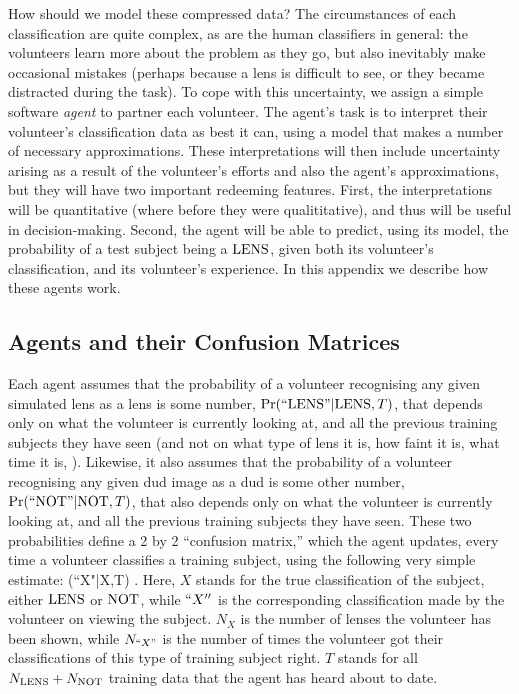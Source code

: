 \documentclass[useAMS,usenatbib,a4paper]{mn2e}
\begin{document}
How should we model these compressed data? The circumstances of each
classification are quite complex, as are the human classifiers in general: the
volunteers learn more about the problem as they go, but also inevitably make
occasional mistakes (perhaps because a lens is difficult to see, or they
became distracted during the task). To cope with this uncertainty, we assign a
simple software {\it agent} to partner each volunteer. The agent's task is to
interpret their volunteer's classification data as best it can, using a model
that makes a number of necessary approximations. These interpretations will
then include uncertainty arising as a result of the volunteer's efforts and
also the agent's approximations, but they will have two important redeeming
features. First, the interpretations will be quantitative (where before they
were qualititative),  and thus will be useful in decision-making. Second, the
agent will be able to predict, using its model, the probability of a test
subject being a ${\rm LENS}$, given both its volunteer's classification, and its
volunteer's experience. In this appendix we describe how these agents work.


\subsection{Agents and their Confusion Matrices}
\label{appendix:swap:probabilities}

Each agent assumes that the probability of a volunteer recognising any given
simulated lens as a lens is some number, ${\rm Pr}({\rm ``LENS"}|{\rm LENS},T)$, that
depends only on what the volunteer is currently looking at, and all the
previous training subjects they have seen (and not on what type of lens it is,
how faint it is, what time it is, \etc). Likewise, it also assumes that the
probability of a volunteer recognising any given dud image as a dud is some
other number, ${\rm Pr}({\rm ``NOT"}|{\rm NOT},T)$, that also depends only on what the volunteer is currently looking at, and all the
previous training subjects they have seen. These two probabilities define a 
2 by 2 ``confusion matrix,'' which the agent updates, every time a
volunteer classifies a training subject, using the following 
very simple estimate:
\be
  \pr(``X"|X,T) \approx {}.
  \label{eq:app:fraction}
\ee
Here, $X$ stands for the true classification of the subject, \ie either
${\rm LENS}$ or ${\rm NOT}$, while $``X''$ is the corresponding classification
made by the volunteer on viewing the subject. $N_X$ is the number of
lenses the volunteer has been shown, while $N_{``X"}$ is the number of 
times the volunteer got their classifications of this type of training subject
right. $T$ stands for all
$N_{{\rm LENS}} + N_{{\rm NOT}}$ training data that the agent has heard about to
date. 
\end{document}
